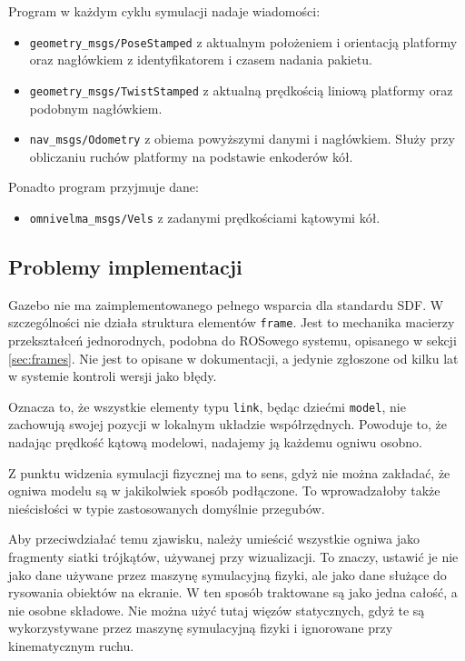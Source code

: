		Program w każdym cyklu symulacji nadaje wiadomości:
		\begin{itemize}
		\item \texttt{geometry\_msgs/PoseStamped} z aktualnym położeniem i orientacją platformy oraz nagłówkiem z identyfikatorem i czasem nadania pakietu.
		\item \texttt{geometry\_msgs/TwistStamped} z aktualną prędkością liniową platformy oraz podobnym nagłówkiem.
		\item \texttt{nav\_msgs/Odometry} z obiema powyższymi danymi i nagłówkiem. Służy przy obliczaniu ruchów platformy na podstawie enkoderów kół.
		\end{itemize}
		Ponadto program przyjmuje dane:
		\begin{itemize}
		\item \texttt{omnivelma\_msgs/Vels} z zadanymi prędkościami kątowymi kół.
		\end{itemize}
	
	\subsection{Problemy implementacji}
		Gazebo nie ma zaimplementowanego pełnego wsparcia dla standardu SDF.
		W szczególności nie działa struktura elementów \texttt{frame}.
		Jest to mechanika macierzy przekształceń jednorodnych, podobna do ROSowego systemu, opisanego w sekcji \ref{sec:frames}.
		Nie jest to opisane w dokumentacji, a jedynie zgłoszone od kilku lat w systemie kontroli wersji jako błędy.

		Oznacza to, że wszystkie elementy typu \texttt{link}, będąc dziećmi \texttt{model}, nie zachowują swojej pozycji w lokalnym układzie współrzędnych.
		Powoduje to, że nadając prędkość kątową modelowi, nadajemy ją każdemu ogniwu osobno.
		
		Z punktu widzenia symulacji fizycznej ma to sens, gdyż nie można zakładać, że ogniwa modelu są w jakikolwiek sposób podłączone. 
		To wprowadzałoby także nieścisłości w typie zastosowanych domyślnie przegubów.

		Aby przeciwdziałać temu zjawisku, należy umieścić wszystkie ogniwa jako fragmenty siatki trójkątów, używanej przy wizualizacji.
		To znaczy, ustawić je nie jako dane używane przez maszynę symulacyjną fizyki, ale jako dane służące do rysowania obiektów na ekranie.
		W ten sposób traktowane są jako jedna całość, a nie osobne składowe.
		Nie można użyć tutaj więzów statycznych, gdyż te są wykorzystywane przez maszynę symulacyjną fizyki i ignorowane przy kinematycznym ruchu.

